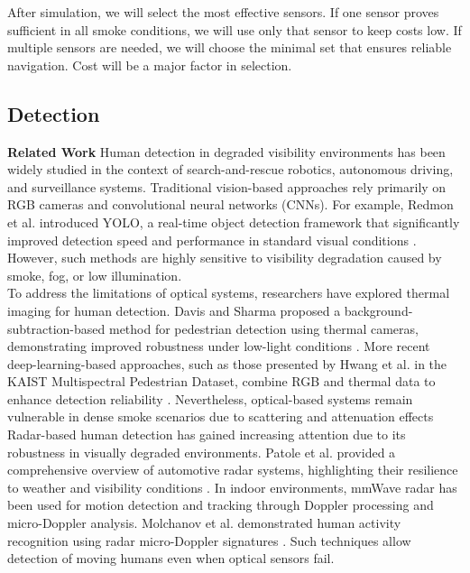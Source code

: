 \documentclass[conference]{IEEEtran}
\begin{document}
After simulation, we will select the most effective sensors. If one sensor proves sufficient in all smoke conditions, we will use only that sensor to keep costs low. If multiple sensors are needed, we will choose the minimal set that ensures reliable navigation. Cost will be a major factor in selection.\\

\subsection*{Detection}
\textbf{Related Work}
\newline
Human detection in degraded visibility environments has been widely studied in the context of search-and-rescue robotics, autonomous driving, and surveillance systems. Traditional vision-based approaches rely primarily on RGB cameras and convolutional neural networks (CNNs). For example, Redmon et al. introduced YOLO, a real-time object detection framework that significantly improved detection speed and performance in standard visual conditions \cite{yolo}. However, such methods are highly sensitive to visibility degradation caused by smoke, fog, or low illumination.\\

To address the limitations of optical systems, researchers have explored thermal imaging for human detection. Davis and Sharma proposed a background-subtraction-based method for pedestrian detection using thermal cameras, demonstrating improved robustness under low-light conditions \cite{thermal_detection}. More recent deep-learning-based approaches, such as those presented by Hwang et al. in the KAIST Multispectral Pedestrian Dataset, combine RGB and thermal data to enhance detection reliability \cite{kaist}. Nevertheless, optical-based systems remain vulnerable in dense smoke scenarios due to scattering and attenuation effects\\

Radar-based human detection has gained increasing attention due to its robustness in visually degraded environments. Patole et al. provided a comprehensive overview of automotive radar systems, highlighting their resilience to weather and visibility conditions \cite{radar_review}. In indoor environments, mmWave radar has been used for motion detection and tracking through Doppler processing and micro-Doppler analysis. Molchanov et al. demonstrated human activity recognition using radar micro-Doppler signatures \cite{micro_doppler}. Such techniques allow detection of moving humans even when optical sensors fail.\\
\end{document}
